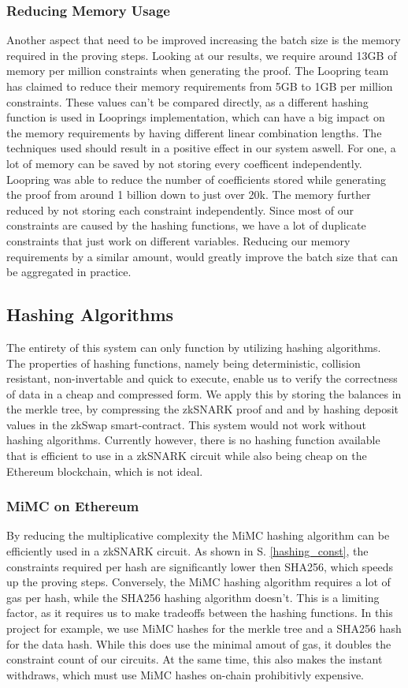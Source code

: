 \documentclass[../../thesis.tex]{subfiles}
\begin{document}
\subsubsection{Reducing Memory Usage}
Another aspect that need to be improved increasing the batch size is the memory required in the proving steps. Looking at our results, we require around 13GB of memory per million constraints when generating the proof. The Loopring team has claimed to reduce their memory requirements from 5GB to 1GB per million constraints. These values can't be compared directly, as a different hashing function is used in Looprings implementation, which can have a big impact on the memory requirements by having different linear combination lengths. The techniques used should result in a positive effect in our system aswell. For one, a lot of memory can be saved by not storing every coefficent independently. Loopring was able to reduce the number of coefficients stored while generating the proof from around 1 billion down to just over 20k. The memory further reduced by not storing each constraint independently. Since most of our constraints are caused by the hashing functions, we have a lot of duplicate constraints that just work on different variables. Reducing our memory requirements by a similar amount, would greatly improve the batch size that can be aggregated in practice. 

\subsection{Hashing Algorithms}
The entirety of this system can only function by utilizing hashing algorithms. The properties of hashing functions, namely being deterministic, collision resistant, non-invertable and quick to execute, enable us to verify the correctness of data in a cheap and compressed form. We apply this by storing the balances in the merkle tree, by compressing the zkSNARK proof and and by hashing deposit values in the zkSwap smart-contract. This system would not work without hashing algorithms. Currently however, there is no hashing function available that is efficient to use in a zkSNARK circuit while also being cheap on the Ethereum blockchain, which is not ideal. 

\subsubsection{MiMC on Ethereum} \label{mimc_eth}
By reducing the multiplicative complexity the MiMC hashing algorithm can be efficiently used in a zkSNARK circuit. As shown in S. \ref{hashing_const}, the constraints required per hash are significantly lower then SHA256, which speeds up the proving steps. Conversely, the MiMC hashing algorithm requires a lot of gas per hash, while the SHA256 hashing algorithm doesn't. This is a limiting factor, as it requires us to make tradeoffs between the hashing functions. In this project for example, we use MiMC hashes for the merkle tree and a SHA256 hash for the data hash. While this does use the minimal amout of gas, it doubles the constraint count of our circuits. At the same time, this also makes the instant withdraws, which must use MiMC hashes on-chain prohibitivly expensive. 
\end{document}
